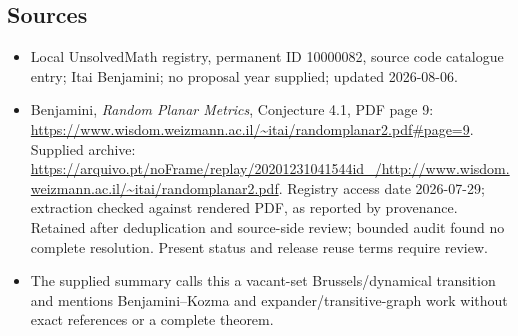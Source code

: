 \documentclass[11pt]{article}
\begin{document}
\subsection{Sources}
\begin{itemize}
\item Local UnsolvedMath registry, permanent ID 10000082, source code catalogue entry; Itai Benjamini; no proposal year supplied; updated 2026-08-06.
\item Benjamini, \emph{Random Planar Metrics}, Conjecture 4.1, PDF page 9: \url{https://www.wisdom.weizmann.ac.il/~itai/randomplanar2.pdf#page=9}. Supplied archive: \url{https://arquivo.pt/noFrame/replay/20201231041544id_/http://www.wisdom.weizmann.ac.il/~itai/randomplanar2.pdf}. Registry access date 2026-07-29; extraction checked against rendered PDF, as reported by provenance. Retained after deduplication and source-side review; bounded audit found no complete resolution. Present status and release reuse terms require review.
\item The supplied summary calls this a vacant-set Brussels/dynamical transition and mentions Benjamini--Kozma and expander/transitive-graph work without exact references or a complete theorem.
\end{itemize}
\end{document}

